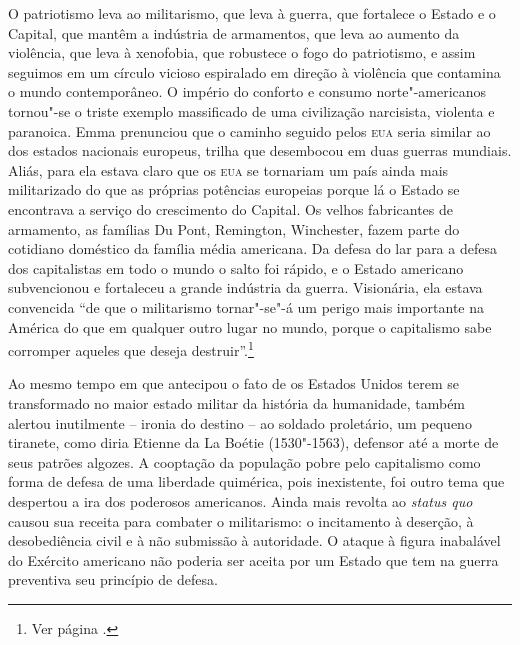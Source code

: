 O patriotismo leva ao militarismo, que leva à guerra, que fortalece o
Estado e o Capital, que mantêm a indústria de armamentos, que leva ao
aumento da violência, que leva à xenofobia, que robustece o fogo do
patriotismo, e assim seguimos em um círculo vicioso espiralado em
direção à violência que contamina o mundo contemporâneo. O império do
conforto e consumo norte"-americanos tornou"-se o triste exemplo
massificado de uma civilização narcisista, violenta e paranoica. Emma
prenunciou que o caminho seguido pelos \textsc{eua} seria similar ao dos estados
nacionais europeus, trilha que desembocou em duas guerras mundiais.
Aliás, para ela estava claro que os \textsc{eua} se tornariam um país ainda mais
militarizado do que as próprias potências europeias porque lá o Estado
se encontrava a serviço do crescimento do Capital. Os velhos
fabricantes de armamento, as famílias Du Pont, Remington, Winchester,
fazem parte do cotidiano doméstico da família média americana. Da
defesa do lar para a defesa dos capitalistas em todo o mundo o salto
foi rápido, e o Estado americano subvencionou e fortaleceu a grande
indústria da guerra. Visionária, ela estava convencida 
``de que o
militarismo tornar"-se"-á um perigo mais importante na América do que
em qualquer outro lugar no mundo, porque o capitalismo sabe corromper
aqueles que deseja destruir''.\footnote{ Ver página \pageref{dequeomilitarismo}.}

Ao mesmo tempo em que antecipou o fato de os Estados Unidos terem se
transformado no maior estado militar da história da humanidade, também
alertou inutilmente – ironia do destino – ao soldado proletário, um
pequeno tiranete, como diria Etienne da La Boétie (1530"-1563), defensor até a morte de
seus patrões algozes. A cooptação da população pobre pelo capitalismo
como forma de defesa de uma liberdade quimérica, pois inexistente, foi
outro tema que despertou a ira dos poderosos americanos. Ainda mais
revolta ao \textit{status quo} causou sua receita para combater o militarismo: o
incitamento à deserção, à desobediência civil e à não submissão à
autoridade. O ataque à figura inabalável do Exército americano não
poderia ser aceita por um Estado que tem na guerra preventiva seu
princípio de defesa. 

